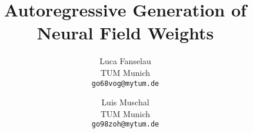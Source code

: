 \documentclass[10pt,twocolumn,letterpaper]{article}
\title{Autoregressive Generation of Neural Field Weights}
\author{Luca Fanselau\\
TUM Munich\\
{\tt\small go68vog@mytum.de}
\and
Luis Muschal\\
TUM Munich\\
{\tt\small go98zoh@mytum.de}
}
\begin{document}
\maketitle







{
    \small
    
    
}

% 
\end{document}
